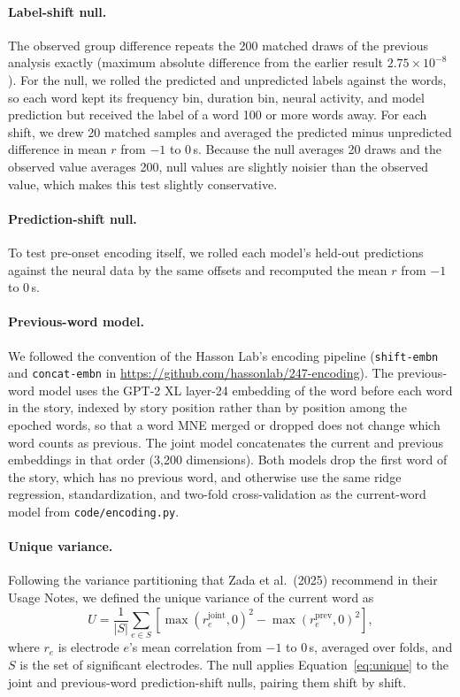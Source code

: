 \documentclass[11pt]{article}
\begin{document}
\paragraph{Label-shift null.}
The observed group difference repeats the 200 matched draws of the previous analysis exactly (maximum absolute difference from the earlier result $2.75 \times 10^{-8}$). For the null, we rolled the predicted and unpredicted labels against the words, so each word kept its frequency bin, duration bin, neural activity, and model prediction but received the label of a word 100 or more words away. For each shift, we drew 20 matched samples and averaged the predicted minus unpredicted difference in mean $r$ from $-1$ to 0\,s. Because the null averages 20 draws and the observed value averages 200, null values are slightly noisier than the observed value, which makes this test slightly conservative.

\paragraph{Prediction-shift null.}
To test pre-onset encoding itself, we rolled each model's held-out predictions against the neural data by the same offsets and recomputed the mean $r$ from $-1$ to 0\,s.

\paragraph{Previous-word model.}
We followed the convention of the Hasson Lab's encoding pipeline (\texttt{shift-embn} and \texttt{concat-embn} in \url{https://github.com/hassonlab/247-encoding}). The previous-word model uses the GPT-2 XL layer-24 embedding of the word before each word in the story, indexed by story position rather than by position among the epoched words, so that a word MNE merged or dropped does not change which word counts as previous. The joint model concatenates the current and previous embeddings in that order (3,200 dimensions). Both models drop the first word of the story, which has no previous word, and otherwise use the same ridge regression, standardization, and two-fold cross-validation as the current-word model from \texttt{code/encoding.py}.

\paragraph{Unique variance.}
Following the variance partitioning that Zada et al.\ (2025) recommend in their Usage Notes, we defined the unique variance of the current word as
\begin{equation}
U = \frac{1}{|S|} \sum_{e \in S} \left[ \max(r^{\mathrm{joint}}_e, 0)^2 - \max(r^{\mathrm{prev}}_e, 0)^2 \right],
\label{eq:unique}
\end{equation}
where $r_e$ is electrode $e$'s mean correlation from $-1$ to 0\,s, averaged over folds, and $S$ is the set of significant electrodes. The null applies Equation~\ref{eq:unique} to the joint and previous-word prediction-shift nulls, pairing them shift by shift.
\end{document}
